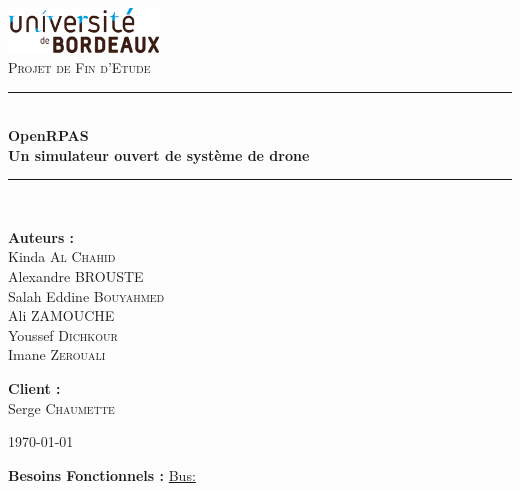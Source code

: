 \documentclass[12pt,a4paper]{article}
\newcommand{\HRule}{\rule{\linewidth}{0.5mm}}
\begin{document}
\begin{titlepage}
\begin{center}

\includegraphics[width=0.3\textwidth]{images/universite_bordeaux_logo.png}\\[1cm]    


\textsc{\Large Projet de Fin d'Etude}\\[0.5cm]

\vspace{30pt}
\HRule \\[0.4cm]
{ \huge \bfseries OpenRPAS
\\Un simulateur ouvert
de système de drone}\\[0.4cm]

\HRule \\[1.5cm]

\begin{minipage}{0.4\textwidth}
\begin{flushleft} \large
\textbf{Auteurs :}\\
Kinda \textsc{Al Chahid}\\
Alexandre \textsc{BROUSTE}\\
Salah Eddine  \textsc{Bouyahmed}\\
Ali  \textsc{ZAMOUCHE}\\
Youssef \textsc{Dichkour}\\
Imane \textsc{Zerouali}
\end{flushleft}
\end{minipage}
\begin{minipage}{0.4\textwidth}
\begin{flushright} \large
\textbf{Client :} \\
Serge \textsc{Chaumette}\\
\end{flushright}
\end{minipage}

\vfill

{\large \today}

\end{center}

\end{titlepage}



\textbf{Besoins Fonctionnels :}
\newline
\underline{Bus:}\\
\newline
\end{document}

